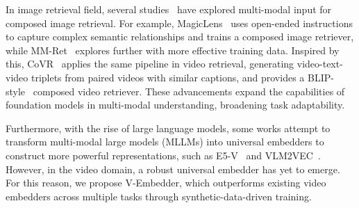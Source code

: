 In image retrieval field, several studies~\cite{zhang2024magiclens,zhou2024megapairs,wei2025uniir} have explored multi-modal input for composed image retrieval. For example,  MagicLens~\cite{zhang2024magiclens} uses open-ended instructions to capture complex semantic relationships and trains a composed image retriever, while MM-Ret~\cite{zhou2024megapairs} explores further with more effective training data. Inspired by this, CoVR~\cite{ventura2024covr} applies the same pipeline in video retrieval, generating video-text-video triplets from paired videos with similar captions, and provides a BLIP-style~\cite{li2022blip} composed video retriever. These advancements expand the capabilities of foundation models in multi-modal understanding, broadening task adaptability.

Furthermore, with the rise of large language models, some works attempt to transform multi-modal large models (MLLMs) into universal embedders to construct more powerful representations, such as E5-V~\cite{jiang2024e5} and VLM2VEC~\cite{jiang2025vlm2vec}. However, in the video domain, a robust universal embedder has yet to emerge.  For this reason, we propose V-Embedder, which outperforms existing video embedders across multiple tasks through synthetic-data-driven training.